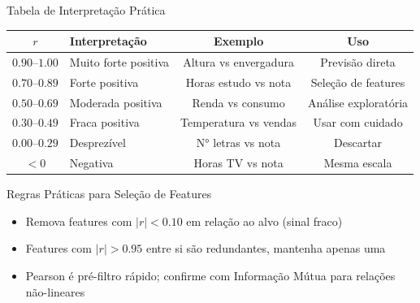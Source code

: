 \documentclass[aspectratio=169]{beamer}
\begin{document}
\begin{frame}{Tabela de Interpretação Prática}
    \begin{center}\footnotesize
    \begin{tabular}{clcc}
    \toprule
    $r$ & Interpretação & Exemplo & Uso \\
    \midrule
    $0{.}90$--$1{.}00$ & Muito forte positiva & Altura vs envergadura & Previsão direta \\
    $0{.}70$--$0{.}89$ & Forte positiva & Horas estudo vs nota & Seleção de features \\
    $0{.}50$--$0{.}69$ & Moderada positiva & Renda vs consumo & Análise exploratória \\
    $0{.}30$--$0{.}49$ & Fraca positiva & Temperatura vs vendas & Usar com cuidado \\
    $0{.}00$--$0{.}29$ & Desprezível & N° letras vs nota & Descartar \\
    $< 0$ & Negativa & Horas TV vs nota & Mesma escala \\
    \bottomrule
    \end{tabular}
    \end{center}
    \pause
    \begin{alertblock}{Regras Práticas para Seleção de Features}
        \footnotesize
        \begin{itemize}
            \item Remova features com $|r| < 0{.}10$ em relação ao alvo (sinal fraco)
            \item Features com $|r| > 0{.}95$ entre si são redundantes, mantenha apenas uma
            \item Pearson é pré-filtro rápido; confirme com Informação Mútua para relações não-lineares
        \end{itemize}
    \end{alertblock}
\end{frame}
\end{document}
